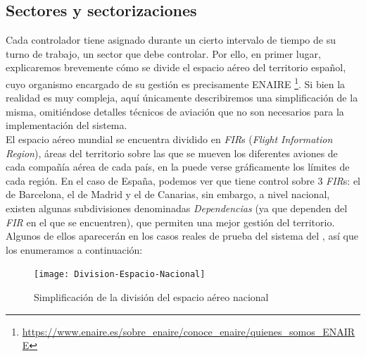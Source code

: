 \subsection{Sectores y sectorizaciones}
\label{section:2:sectores-y-sectorizacion}
Cada controlador tiene asignado durante un cierto intervalo de tiempo de su turno de trabajo, un sector que debe controlar.
Por ello, en primer lugar, explicaremos brevemente cómo se divide el espacio aéreo del territorio español, cuyo organismo
encargado de su gestión es precisamente ENAIRE
\footnote{\url{https://www.enaire.es/sobre_enaire/conoce_enaire/quienes_somos_ENAIRE}}.
Si bien la realidad es muy compleja, aquí únicamente describiremos una simplificación de la misma, omitiéndose
detalles técnicos de aviación que no son necesarios para la implementación del sistema.
\\

El espacio aéreo mundial se encuentra dividido en \textit{FIR}s (\textit{Flight Information Region}), áreas del
territorio sobre las que se mueven los diferentes aviones de cada compañía aérea de cada país, en la
 puede verse gráficamente los límites de cada región. En el caso de España,
podemos ver que tiene control sobre 3 \textit{FIR}s: el de Barcelona, el de Madrid y el de Canarias, sin embargo,
a nivel nacional, existen algunas subdivisiones denominadas \textit{Dependencias} (ya que dependen del \textit{FIR}
en el que se encuentren), que permiten una mejor gestión del territorio. Algunos de ellos aparecerán en los casos reales de prueba del sistema del , así que los enumeramos a continuación:

\begin{figure}[htbp]
    \centering
    \texttt{[image: Division-Espacio-Nacional]}
    \caption{Simplificación de la división del espacio aéreo nacional}
    \label{fig:2:regiones}
\end{figure}

